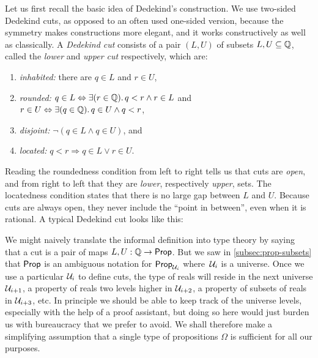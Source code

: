 %
Let us first recall the basic idea of Dedekind's construction. We use two-sided Dedekind
cuts, as opposed to an often used one-sided version, because the symmetry makes
constructions more elegant, and it works constructively as well as classically.
%
A \emph{Dedekind cut} consists of a pair $(L, U)$ of subsets $L, U \subseteq \mathbb{Q}$, called the
\emph{lower} and \emph{upper cut} respectively, which are:
%
\begin{enumerate}
\item \emph{inhabited:} there are $q \in L$ and $r \in U$,
\item \emph{rounded:} $q \in L \Leftrightarrow \exis {r \in \Q} q < r \land r \in L$
  and $r \in U \Leftrightarrow \exis {q \in \Q} q \in U \land q < r$,
\item \emph{disjoint:} $\lnot (q \in L \land q \in U)$, and
\item \emph{located:} $q < r \Rightarrow q \in L \lor r \in U$.
\end{enumerate}
%
Reading the roundedness condition from left to right tells us that cuts are \emph{open},
%
and from right to left that they are \emph{lower}, respectively \emph{upper}, sets. The
locatedness condition states that there is no large gap between $L$ and $U$. Because cuts
are always open, they never include the ``point in between'', even when it is rational. A
typical Dedekind cut looks like this:
%
\begin{center}
\end{center}
%
We might naively translate the informal definition into type theory by saying that a cut
is a pair of maps $L, U : \mathbb{Q} \to \mathsf{Prop}$. But we saw in \cref{subsec:prop-subsets} that
$\mathsf{Prop}$ is an ambiguous notation for $\mathsf{Prop}_{\mathcal{U}_i}$ where~$\mathcal{U}_i$ is a universe. Once we
use a particular $\mathcal{U}_i$ to define cuts, the type of reals will reside in the next
universe $\mathcal{U}_{i+1}$, a property of reals two levels higher in $\mathcal{U}_{i+2}$, a property of
subsets of reals in $\mathcal{U}_{i+3}$, etc. In principle we should be able to keep track of the
universe levels, especially with the help of a proof assistant, but doing so here would
just burden us with bureaucracy that we prefer to avoid. We shall therefore make a
simplifying assumption that a single type of propositions $\Omega$ is sufficient for all
our purposes.

